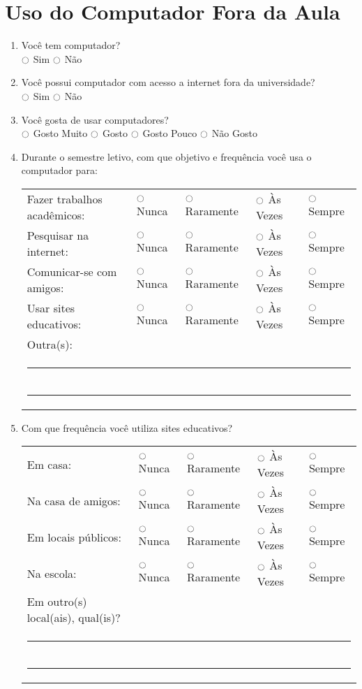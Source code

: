 \section{Uso do Computador Fora da Aula}
\begin{enumerate}
\item Você tem computador? \\
$\ocircle$ Sim $\ocircle$ Não 
    
\item Voc\^e possui computador com acesso a internet fora da universidade? \\
$\ocircle$ Sim $\ocircle$ Não
    
\item Você gosta de usar computadores? \\
$\ocircle$ Gosto Muito $\ocircle$ Gosto $\ocircle$ Gosto Pouco $\ocircle$ Não Gosto

\item Durante o semestre letivo, com que objetivo e frequência você usa o computador para: \\
\begin{tabular}{lllll}
	Fazer trabalhos acadêmicos: & $\ocircle$ Nunca & $\ocircle$ Raramente & $\ocircle$ Às Vezes & $\ocircle$ Sempre \\
	Pesquisar na internet: & $\ocircle$ Nunca & $\ocircle$ Raramente & $\ocircle$ Às Vezes & $\ocircle$ Sempre \\
	Comunicar-se com amigos: & $\ocircle$ Nunca & $\ocircle$ Raramente & $\ocircle$ Às Vezes & $\ocircle$ Sempre \\
	Usar sites educativos: & $\ocircle$ Nunca & $\ocircle$ Raramente & $\ocircle$ Às Vezes & $\ocircle$ Sempre \\
	Outra(s): \\
	\multicolumn{5}{l}{\noindent\rule{\textwidth}{0.4pt}} \\
	\multicolumn{5}{l}{\noindent\rule{\textwidth}{0.4pt}} \\
\end{tabular}

\item Com que frequência você utiliza sites educativos? \\
\begin{tabular}{lllll}
	Em casa: & $\ocircle$ Nunca & $\ocircle$ Raramente & $\ocircle$ Às Vezes & $\ocircle$ Sempre \\
	Na casa de amigos: & $\ocircle$ Nunca & $\ocircle$ Raramente & $\ocircle$ Às Vezes & $\ocircle$ Sempre \\
	Em locais públicos: & $\ocircle$ Nunca & $\ocircle$ Raramente & $\ocircle$ Às Vezes & $\ocircle$ Sempre \\
	Na escola: & $\ocircle$ Nunca & $\ocircle$ Raramente & $\ocircle$ Às Vezes & $\ocircle$ Sempre \\
	Em outro(s) local(ais), qual(is)? \\
	\multicolumn{5}{l}{\noindent\rule{\textwidth}{0.4pt}} \\
	\multicolumn{5}{l}{\noindent\rule{\textwidth}{0.4pt}} \\
\end{tabular}


\end{enumerate}
